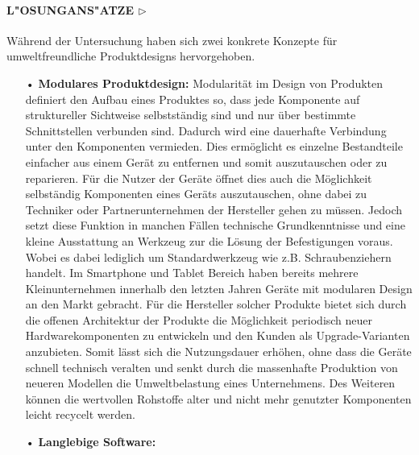 \documentclass[12pt,titlepage]{article}
\begin{document}
\paragraph{\textbf{L"OSUNGANS"ATZE $\triangleright$}}
Während der Untersuchung haben sich zwei konkrete Konzepte für umweltfreundliche Produktdesigns hervorgehoben. 
\begin{itemize}
\item[•] \textbf{Modulares Produktdesign:}
Modularität im Design von Produkten definiert den Aufbau eines Produktes so, dass jede Komponente auf struktureller Sichtweise selbstständig sind und nur über bestimmte Schnittstellen verbunden sind. Dadurch wird eine dauerhafte Verbindung unter den Komponenten vermieden. Dies ermöglicht es einzelne Bestandteile einfacher aus einem Gerät zu entfernen und somit auszutauschen oder zu reparieren. Für die Nutzer der Geräte öffnet dies auch die Möglichkeit selbständig Komponenten eines Geräts auszutauschen, ohne dabei zu Techniker oder Partnerunternehmen der Hersteller gehen zu müssen. Jedoch setzt diese Funktion in manchen Fällen technische Grundkenntnisse und eine kleine Ausstattung an Werkzeug zur die Lösung der Befestigungen voraus. Wobei es dabei lediglich um Standardwerkzeug wie z.B. Schraubenziehern handelt. Im Smartphone und Tablet Bereich haben bereits mehrere Kleinunternehmen innerhalb den letzten Jahren Geräte mit modularen Design an den Markt gebracht. Für die Hersteller solcher Produkte bietet sich durch die offenen Architektur der Produkte die Möglichkeit periodisch neuer Hardwarekomponenten zu entwickeln und den Kunden als Upgrade-Varianten anzubieten. Somit lässt sich die Nutzungsdauer erhöhen, ohne dass die Geräte schnell technisch veralten und senkt durch die massenhafte Produktion von neueren Modellen die Umweltbelastung eines Unternehmens. Des Weiteren können die wertvollen Rohstoffe alter und nicht mehr genutzter Komponenten leicht recycelt werden.\\
\item[•] \textbf{Langlebige Software:}

\end{itemize}
\end{document}
